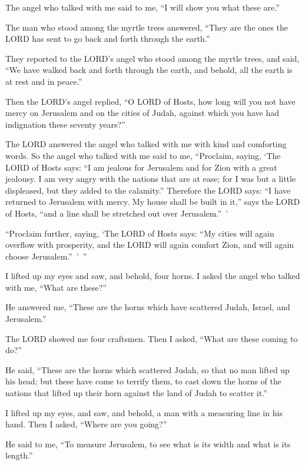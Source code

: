The angel who talked with me said to me, “I will show you what these are.”

\myverse{}The man who stood among the myrtle trees answered, “They are
the ones the LORD has sent to go back and forth through the earth.”

\myverse{}They reported to the LORD’s angel who stood among the myrtle
trees, and said, “We have walked back and forth through the earth, and behold, all the earth is at rest
and in peace.”

\myverse{}Then the LORD’s angel replied, “O LORD of Hosts, how long will
you not have mercy on Jerusalem and on the cities of Judah, against which you have had indignation these
seventy years?”

\myverse{}The LORD answered the angel who talked with me with kind and
comforting words.
\myverse{}So the angel who talked with me said to me, “Proclaim, saying, ‘The LORD of
Hosts says: “I am jealous for Jerusalem and for Zion with a great jealousy.
\myverse{}I am very angry with the nations that are at ease; for I was but a little
displeased, but they added to the calamity.”
\myverse{}Therefore the LORD says: “I have returned to Jerusalem with mercy. My house
shall be built in it,” says the LORD of Hosts, “and a line shall be stretched out over Jerusalem.” ’

\myverse{}“Proclaim further, saying, ‘The LORD of Hosts says: “My cities
will again overflow with prosperity, and the LORD will again comfort Zion, and will again choose Jerusalem.” ’ ”

\myverse{}I lifted up my eyes and saw, and behold, four horns.
\myverse{}I asked the angel who talked with me, “What are these?”

He answered me, “These are the horns which have scattered Judah, Israel, and Jerusalem.”

\myverse{}The LORD showed me four craftsmen.
\myverse{}Then I asked, “What are these coming to do?”

He said, “These are the horns which scattered Judah, so that no man lifted up his head; but
these have come to terrify them, to cast down the horns of the nations that lifted up their horn against
the land of Judah to scatter it.”


\mychapter{} \myverse*{}I lifted up my eyes, and saw, and behold, a man with a measuring
line in his hand.
\myverse{}Then I asked, “Where are you going?”

He said to me, “To measure Jerusalem, to see what is its width and what is its length.”

